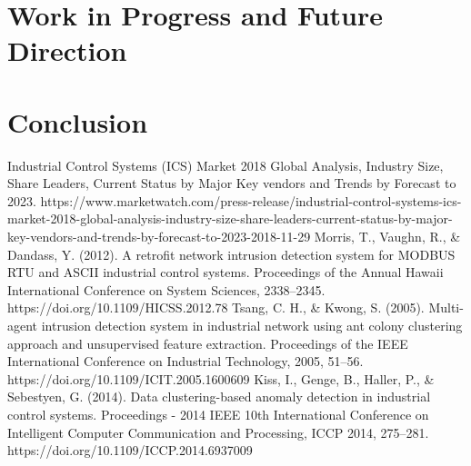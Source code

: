 \documentclass[conference]{IEEEtran}
\begin{document}
\section{Work in Progress and Future Direction}

\section{Conclusion}




\begin{thebibliography}{00}
Industrial Control Systems (ICS) Market 2018 Global Analysis, Industry Size, Share Leaders, Current Status by Major Key vendors and Trends by Forecast to 2023. https://www.marketwatch.com/press-release/industrial-control-systems-ics-market-2018-global-analysis-industry-size-share-leaders-current-status-by-major-key-vendors-and-trends-by-forecast-to-2023-2018-11-29
Morris, T., Vaughn, R., \& Dandass, Y. (2012). A retrofit network intrusion detection system for MODBUS RTU and ASCII industrial control systems. Proceedings of the Annual Hawaii International Conference on System Sciences, 2338–2345. https://doi.org/10.1109/HICSS.2012.78
Tsang, C. H., \& Kwong, S. (2005). Multi-agent intrusion detection system in industrial network using ant colony clustering approach and unsupervised feature extraction. Proceedings of the IEEE International Conference on Industrial Technology, 2005, 51–56. https://doi.org/10.1109/ICIT.2005.1600609
Kiss, I., Genge, B., Haller, P., & Sebestyen, G. (2014). Data clustering-based anomaly detection in industrial control systems. Proceedings - 2014 IEEE 10th International Conference on Intelligent Computer Communication and Processing, ICCP 2014, 275–281. https://doi.org/10.1109/ICCP.2014.6937009
\end{thebibliography}
\vspace{12pt}
\end{document}
